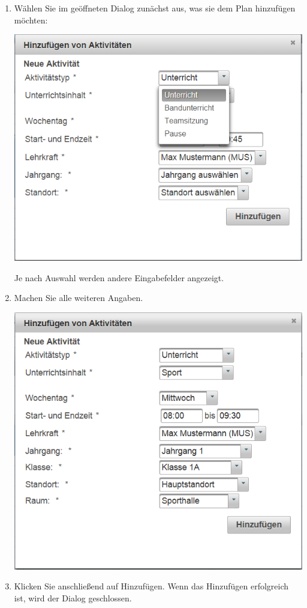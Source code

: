 \documentclass[fontsize=12pt]{scrartcl}
\begin{document}
\begin{enumerate}
\item Wählen Sie im geöffneten Dialog zunächst aus, was sie dem Plan hinzufügen möchten: \medskip\\
	\begin{minipage}[t]{\linewidth}
            \includegraphics[width=.8\linewidth]{images/addActivity.png}
    \end{minipage} 
    \medskip
    Je nach Auswahl werden andere Eingabefelder angezeigt.
    \clearpage
\item Machen Sie alle weiteren Angaben.\medskip\\
	\begin{minipage}[t]{\linewidth}
            \includegraphics[width=.8\linewidth]{images/addActivity2.png}
    \end{minipage} 
    \medskip
\item Klicken Sie anschließend auf Hinzufügen. Wenn das Hinzufügen erfolgreich ist, wird der Dialog geschlossen.
\end{enumerate}
\end{document}
